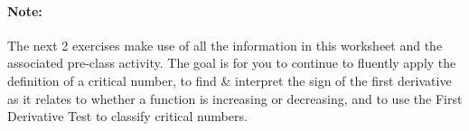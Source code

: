\documentclass[10pt]{article}
\begin{document}

\vfill

\newpage

\paragraph*{Note:} The next 2 exercises make use of all the information in this worksheet and the associated pre-class activity. The goal is for you to continue to fluently apply the definition of a critical number, to find \& interpret the sign of the first derivative as it relates to whether a function is increasing or decreasing, and to use the First Derivative Test to classify critical numbers.\\
\end{document}
